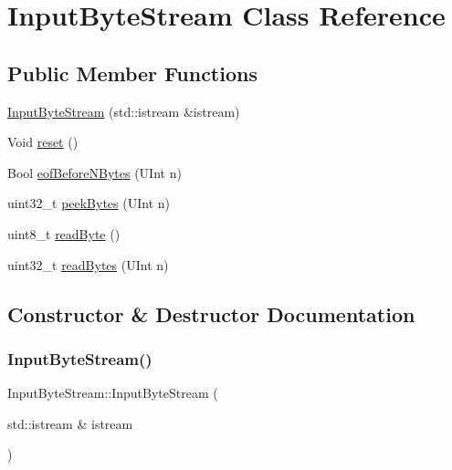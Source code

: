 \hypertarget{class_input_byte_stream}{}\section{Input\+Byte\+Stream Class Reference}
\label{class_input_byte_stream}
\subsection*{Public Member Functions}
\begin{DoxyCompactItemize}
\item 
\hyperlink{class_input_byte_stream_a1804631987950a7666072d2d1c43071a}{Input\+Byte\+Stream} (std\+::istream \&istream)
\item 
Void \hyperlink{class_input_byte_stream_a7f10425050d4ab289a554ba4dc393b6e}{reset} ()
\item 
Bool \hyperlink{class_input_byte_stream_ae4aafbd84cda302960e5f7497bdbd227}{eof\+Before\+N\+Bytes} (U\+Int n)
\item 
uint32\+\_\+t \hyperlink{class_input_byte_stream_a48ed506d95bbcbc505b2b077914aa174}{peek\+Bytes} (U\+Int n)
\item 
uint8\+\_\+t \hyperlink{class_input_byte_stream_aeb1e7066dd0598ff699fbcdaf4cba65d}{read\+Byte} ()
\item 
uint32\+\_\+t \hyperlink{class_input_byte_stream_a39c4f28d59c707f2c1d06603f6eefa0e}{read\+Bytes} (U\+Int n)
\end{DoxyCompactItemize}


\subsection{Constructor \& Destructor Documentation}
\mbox{\label{class_input_byte_stream_a1804631987950a7666072d2d1c43071a}} 
\subsubsection{\texorpdfstring{Input\+Byte\+Stream()}{InputByteStream()}}
{\footnotesize\ttfamily Input\+Byte\+Stream\+::\+Input\+Byte\+Stream (\begin{DoxyParamCaption}\item[{std\+::istream \&}]{istream }\end{DoxyParamCaption})\hspace{0.3cm}{\ttfamily [inline]}}


